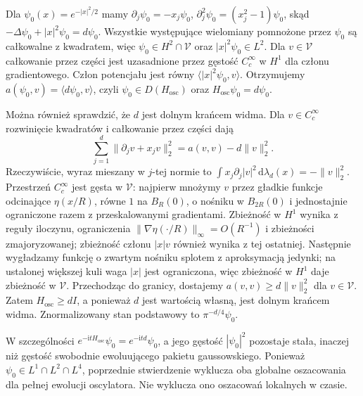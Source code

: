 \begin{przyklad}
Dla $\psi_0(x)=e^{-|x|^2/2}$ mamy
$\partial_j\psi_0=-x_j\psi_0$,
$\partial_j^2\psi_0=(x_j^2-1)\psi_0$, skąd
$-\Delta\psi_0+|x|^2\psi_0=d\psi_0$.
Wszystkie występujące wielomiany pomnożone
przez $\psi_0$ są całkowalne z kwadratem,
więc $\psi_0\in H^2\cap\mathcal V$ oraz
$|x|^2\psi_0\in L^2$.
Dla $v\in\mathcal V$ całkowanie przez części
jest uzasadnione przez gęstość $C_c^\infty$
w $H^1$ dla członu gradientowego.
Człon potencjału jest równy
$\langle |x|^2\psi_0,v\rangle$.
Otrzymujemy $a(\psi_0,v)=\langle d\psi_0,v\rangle$,
czyli $\psi_0\in D(H_{\mathrm{osc}})$ oraz
$H_{\mathrm{osc}}\psi_0=d\psi_0$.

Można również sprawdzić, że $d$ jest dolnym
krańcem widma. Dla $v\in C_c^\infty$ rozwinięcie
kwadratów i całkowanie przez części dają
\[
 \sum_{j=1}^d\|\partial_jv+x_jv\|_2^2
 =a(v,v)-d\|v\|_2^2.
\]
Rzeczywiście, wyraz mieszany w $j$-tej normie to
$\int x_j\partial_j|v|^2\,\mathrm d\lambda_d(x)
=-\|v\|_2^2$.
Przestrzeń $C_c^\infty$ jest gęsta w $\mathcal V$:
najpierw mnożymy $v$ przez gładkie funkcje
odcinające $\eta(x/R)$, równe $1$ na $B_R(0)$,
o nośniku w $B_{2R}(0)$ i jednostajnie ograniczone
razem z przeskalowanymi gradientami.
Zbieżność w $H^1$ wynika z reguły iloczynu,
ograniczenia $\|\nabla\eta(\cdot/R)\|_\infty=O(R^{-1})$
i zbieżności zmajoryzowanej; zbieżność członu
$|x|v$ również wynika z tej ostatniej.
Następnie wygładzamy funkcję o zwartym nośniku
splotem z aproksymacją jedynki; na ustalonej
większej kuli waga $|x|$ jest ograniczona,
więc zbieżność w $H^1$ daje zbieżność w $\mathcal V$.
Przechodząc do granicy, dostajemy
$a(v,v)\ge d\|v\|_2^2$ dla $v\in\mathcal V$.
Zatem $H_{\mathrm{osc}}\ge dI$, a ponieważ
$d$ jest wartością własną, jest dolnym krańcem widma.
Znormalizowany stan podstawowy to
$\pi^{-d/4}\psi_0$.

W szczególności
$e^{-\mathrm itH_{\mathrm{osc}}}\psi_0=
e^{-\mathrm itd}\psi_0$, a jego gęstość
$|\psi_0|^2$ pozostaje stała, inaczej niż
gęstość swobodnie ewoluującego pakietu gaussowskiego.
Ponieważ $\psi_0\in L^1\cap L^2\cap L^4$,
poprzednie stwierdzenie wyklucza oba globalne
oszacowania dla pełnej ewolucji oscylatora.
Nie wyklucza ono oszacowań lokalnych w czasie.
\end{przyklad}

